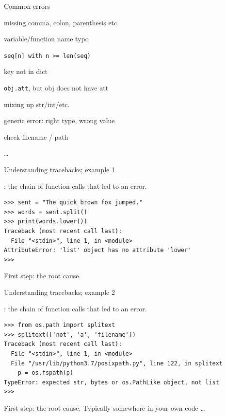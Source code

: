 \documentclass[aspectratio=169,usenames,dvipsnames]{beamer}
\begin{document}
\begin{frame}{Common errors}
    \begin{description}[AttributeError]
        \item[SyntaxError] missing comma, colon, parenthesis etc.
        \item[NameError] variable/function name typo
        \item[IndexError] \texttt{seq[n] with n >= len(seq)}
        \item[KeyError] key not in dict
        \item[AttributeError] \texttt{obj.att}, but obj does not have att
        \item[TypeError] mixing up str/int/etc.
        \item[ValueError] generic error: right type, wrong value
        \item[FileNotFoundError] check filename / path
        \item[\dots] \dots
    \end{description}
\end{frame}

\begin{frame}[fragile]{Understanding tracebacks; example 1}
\begin{definition}
    : the chain of function calls that led to an error.
\end{definition}
\begin{lstlisting}
>>> sent = "The quick brown fox jumped."
>>> words = sent.split()
>>> print(words.lower())
Traceback (most recent call last):
  File "<stdin>", line 1, in <module>
AttributeError: 'list' object has no attribute 'lower'
>>>
\end{lstlisting}
\pause
First step:  the root cause.
\end{frame}

\begin{frame}[fragile]{Understanding tracebacks; example 2}
\begin{definition}
    : the chain of function calls that led to an error.
\end{definition}
\begin{lstlisting}
>>> from os.path import splitext
>>> splitext(['not', 'a', 'filename'])
Traceback (most recent call last):
  File "<stdin>", line 1, in <module>
  File "/usr/lib/python3.7/posixpath.py", line 122, in splitext
    p = os.fspath(p)
TypeError: expected str, bytes or os.PathLike object, not list
>>>
\end{lstlisting}
\pause
First step:  the root cause.
Typically somewhere in your own code \dots
\end{frame}
\end{document}
